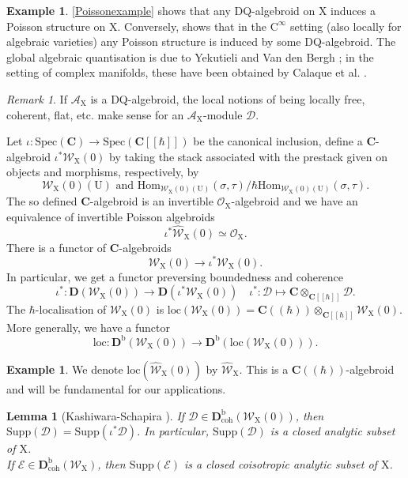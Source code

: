 \documentclass{article}
\theoremstyle{plain}
\newtheorem{lemma}[theorem]{Lemma}
\theoremstyle{definition}
\newtheorem{example}[theorem]{Example}
\theoremstyle{remark}
\newtheorem{remark}[theorem]{Remark}
\newcommand{\mr}{\mathrm}
\newcommand{\Ww}{\widehat{\mathscr{W}}_{\mr{X}}}
\newcommand{\C}{\mathbf C}
\newcommand{\brak}{[\![\hbar]\!]}
\newcommand{\cbrak}{(\!(\hbar)\!)}
\newcommand{\3}{\vspace{3mm}}
\newcommand{\2}{\vspace{2mm}}
\newcommand{\1}{\vspace{1mm}}
\begin{document}
\2
\begin{example}
 \cref{Poissonexample} shows that any DQ-algebroid on $\mr{X}$ induces a Poisson structure on $\mr{X}$. Conversely, \cite{MR2062626} shows that in the $\mr{C}^{\infty}$ setting (also locally for algebraic varieties) any Poisson structure is induced by some DQ-algebroid. The global algebraic quantisation is due to Yekutieli \cite{MR2183259} and Van den Bergh \cite{MR2344349}; in the setting of complex manifolds, these have been obtained by Calaque et al. \cite{MR2364075}.
\end{example}
\2
\begin{remark}
 If $\mathscr{A}_\mr{X}$ is a DQ-algebroid, the local notions of being locally free, coherent, flat, etc. make sense for an $\mathscr{A}_\mr{X}$-module $\mathscr{D}$.
\end{remark}
\2
Let $\iota : \mr{Spec}(\C) \to \mr{Spec}(\C\brak)$ be the canonical inclusion, define a $\C$-algebroid $\iota^{*}\mathscr{W}_\mr{X}(0)$ by taking the stack associated with the prestack given on objects and morphisms, respectively, by $$\mathscr{W}_\mr{X}(0)(\mr{U}) \text{ and } \mr{Hom}_{\mathscr{W}_\mr{X}(0)(\mr{U})}(\sigma,\tau)/\hbar\mr{Hom}_{\mathscr{W}_\mr{X}(0)(\mr{U})}(\sigma,\tau).$$ The so defined $\C$-algebroid is an invertible $\mathscr{O}_\mr{X}$-algebroid and we have an equivalence of invertible Poisson algebroids $$\iota^*\Ww(0)\simeq \mathscr{O}_\mr{X}.$$ There is a functor of $\C$-algebroids $$\mathscr{W}_\mr{X}(0) \to \iota^* \mathscr{W}_\mr{X}(0).$$ In particular, we get a functor preversing boundedness and coherence $$\iota^* :\mr{\mathbf{D}}(\mathscr{W}_\mr{X}(0)) \to \mr{\mathbf{D}}(\iota^*\mathscr{W}_\mr{X}(0)) \quad \iota^*:\mathscr{D} \mapsto \C\otimes_{\C\brak} \mathscr{D}.$$
The $\hbar$-localisation of $\mathscr{W}_\mr{X}(0)$ is $\mr{loc}\left(\mathscr{W}_\mr{X}(0)\right) = \C\cbrak\otimes _{\C\brak}\mathscr{W}_\mr{X}(0)$. More generally, we have a functor $$\mr{loc}: \mr{\mathbf{D}}^{\mr b}(\mathscr{W}_\mr{X}(0)) \to \mr{\mathbf{D}}^{\mr b}\left(\mr{loc}\left(\mathscr{W}_\mr{X}(0)\right)\right).$$
\begin{example}
We denote $\mr{loc}(\Ww(0))$ by $\Ww$. This is a $\C\cbrak$-algebroid and will be fundamental for our applications.
\end{example}
\2
\begin{lemma}[Kashiwara-Schapira \cite{MR3012169}]
 If $\mathscr{D} \in \mr{\mathbf{D}}^{\mr b}_\mr{coh}(\mathscr{W}_\mr{X}(0))$, then $\mr{Supp}(\mathscr{D}) = \mr{Supp}(\iota^*\mathscr{D})$. In particular, $\mr{Supp}(\mathscr{D})$ is a closed analytic subset of $\mr{X}$.\\
 If $\mathscr{E} \in \mr{\mathbf{D}}^{\mr b}_\mr{coh}(\mathscr{W}_\mr{X})$, then $\mr{Supp}(\mathscr{E})$ is a closed coisotropic analytic subset of $\mr{X}$.
\end{lemma}
\end{document}
